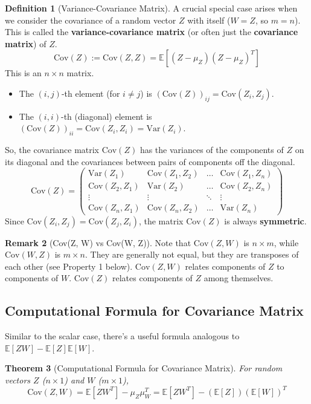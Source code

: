 \documentclass[11pt]{article}
\newtheorem{theorem}{Theorem}[section]
\theoremstyle{definition}
\newtheorem{definition}[theorem]{Definition}
\newtheorem{remark}[theorem]{Remark}
\newcommand{\E}{\mathbb{E}}
\newcommand{\Cov}{\mathrm{Cov}}
\newcommand{\Var}{\mathrm{Var}}
\begin{document}
\begin{definition}[Variance-Covariance Matrix]
A crucial special case arises when we consider the covariance of a random vector $Z$ with itself ($W=Z$, so $m=n$). This is called the \textbf{variance-covariance matrix} (or often just the \textbf{covariance matrix}) of $Z$.
\[ \Cov(Z) := \Cov(Z, Z) = \E[ (Z - \mu_Z) (Z - \mu_Z)^T ] \]
This is an $n \times n$ matrix.
\begin{itemize}
    \item The $(i,j)$-th element (for $i \neq j$) is $(\Cov(Z))_{ij} = \Cov(Z_i, Z_j)$.
    \item The $(i,i)$-th (diagonal) element is $(\Cov(Z))_{ii} = \Cov(Z_i, Z_i) = \Var(Z_i)$.
\end{itemize}
So, the covariance matrix $\Cov(Z)$ has the variances of the components of $Z$ on its diagonal and the covariances between pairs of components off the diagonal.
\[ \Cov(Z) = \begin{pmatrix}
\Var(Z_1) & \Cov(Z_1, Z_2) & \dots & \Cov(Z_1, Z_n) \\
\Cov(Z_2, Z_1) & \Var(Z_2) & \dots & \Cov(Z_2, Z_n) \\
\vdots & \vdots & \ddots & \vdots \\
\Cov(Z_n, Z_1) & \Cov(Z_n, Z_2) & \dots & \Var(Z_n)
\end{pmatrix} \]
Since $\Cov(Z_i, Z_j) = \Cov(Z_j, Z_i)$, the matrix $\Cov(Z)$ is always \textbf{symmetric}.
\end{definition}

\begin{remark}[Cov(Z, W) vs Cov(W, Z)]
Note that $\Cov(Z, W)$ is $n \times m$, while $\Cov(W, Z)$ is $m \times n$. They are generally not equal, but they are transposes of each other (see Property 1 below). $\Cov(Z, W)$ relates components of $Z$ to components of $W$. $\Cov(Z)$ relates components of $Z$ among themselves.
\end{remark}

\subsection{Computational Formula for Covariance Matrix}

Similar to the scalar case, there's a useful formula analogous to $\E[ZW] - \E[Z]\E[W]$.

\begin{theorem}[Computational Formula for Covariance Matrix]
For random vectors $Z$ ($n \times 1$) and $W$ ($m \times 1$),
\[ \Cov(Z, W) = \E[Z W^T] - \mu_Z \mu_W^T = \E[Z W^T] - (\E[Z])(\E[W])^T \]
\end{theorem}
\end{document}
